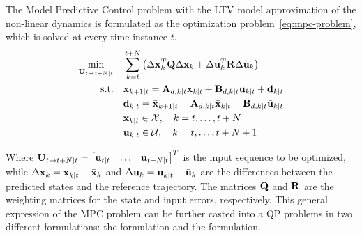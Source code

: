 \documentclass[../main.tex]{subfiles}
\begin{document}
The Model Predictive Control problem with the LTV
model approximation of the non-linear dynamics is formulated as the optimization
problem~\ref{eq:mpc-problem}, which is solved at every time instance $t$.
\begin{equation}\label{eq:mpc-problem}
	\begin{aligned}
		\min_{\mathbf{U}_{t \to t+N | t}} \quad & \sum_{k=t}^{t+N} \left( \Delta
			\mathbf{x}_k^T \mathbf{Q} \Delta \mathbf{x}_k + \Delta \mathbf{u}_k^T \mathbf{R}
			\Delta \mathbf{u}_k \right)\\
		\text{s.t.} \quad & \mathbf{x}_{k+1 | t} = \mathbf{A}_{d,k | t} \mathbf{x}_{k |
		t} + \mathbf{B}_{d,k | t} \mathbf{u}_{k | t} + \mathbf{d}_{k | t}\\
						  & \mathbf{d}_{k | t} = \bar{\mathbf{x}}_{k+1 | t} -
						  \mathbf{A}_{d,k | t} \bar{\mathbf{x}}_{k | t} - \mathbf{B}_{d,k
						  | t} \bar{\mathbf{u}}_{k | t}\\
						  & \mathbf{x}_{k | t} \in \mathcal{X}, \quad k = t, \ldots,
						  t+N\\
						  & \mathbf{u}_{k | t}
						  \in \mathcal{U}, \quad k = t, \ldots, t+N+1\\
		\end{aligned}
\end{equation}

Where $\mathbf{U}_{t \to t+N | t} = \begin{bmatrix} \mathbf{u}_{t | t} & \ldots &
\mathbf{u}_{t+N | t} \end{bmatrix}^T$ is the input sequence to be optimized, while
$\Delta \mathbf{x}_k = \mathbf{x}_{k | t} - \bar{\mathbf{x}}_{k}$ and $\Delta \mathbf{u}_k =
\mathbf{u}_{k | t} - \bar{\mathbf{u}}_{k}$ are the differences between the predicted
states and the reference trajectory. The matrices $\mathbf{Q}$ and $\mathbf{R}$ are
the weighting matrices for the state and input errors, respectively.
This general expression of the MPC problem can be further casted into a QP
problems in two different formulations: the  formulation and the
 formulation.
\end{document}
